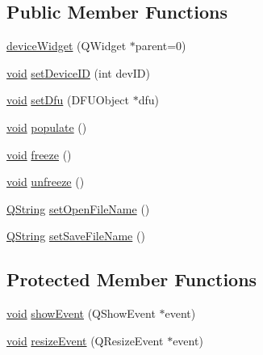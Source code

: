 \subsection*{\-Public \-Member \-Functions}
\begin{DoxyCompactItemize}
\item 
\hyperlink{group___y_modem_uploader_gafcee9273f2b8216d324c235d5e164899}{device\-Widget} (\-Q\-Widget $\ast$parent=0)
\item 
\hyperlink{group___u_a_v_objects_plugin_ga444cf2ff3f0ecbe028adce838d373f5c}{void} \hyperlink{group___y_modem_uploader_ga9b64e94e398f8362d8dcae0b9ec4275f}{set\-Device\-I\-D} (int dev\-I\-D)
\item 
\hyperlink{group___u_a_v_objects_plugin_ga444cf2ff3f0ecbe028adce838d373f5c}{void} \hyperlink{group___y_modem_uploader_gadc475267f79d2e50ec5eac4f043aa058}{set\-Dfu} (\-D\-F\-U\-Object $\ast$dfu)
\item 
\hyperlink{group___u_a_v_objects_plugin_ga444cf2ff3f0ecbe028adce838d373f5c}{void} \hyperlink{group___uploader_gaf56d7d5fb2715ab7213ea4193df3b373}{populate} ()
\item 
\hyperlink{group___u_a_v_objects_plugin_ga444cf2ff3f0ecbe028adce838d373f5c}{void} \hyperlink{group___uploader_gac5513bd475a701ede81cde9432e8ddf2}{freeze} ()
\item 
\hyperlink{group___u_a_v_objects_plugin_ga444cf2ff3f0ecbe028adce838d373f5c}{void} \hyperlink{group___uploader_ga6273e94cd08759c019fbb9a1063cbd26}{unfreeze} ()
\item 
\hyperlink{group___u_a_v_objects_plugin_gab9d252f49c333c94a72f97ce3105a32d}{\-Q\-String} \hyperlink{group___uploader_ga6ad26364234edf8c743b0b08885050b1}{set\-Open\-File\-Name} ()
\item 
\hyperlink{group___u_a_v_objects_plugin_gab9d252f49c333c94a72f97ce3105a32d}{\-Q\-String} \hyperlink{group___uploader_ga1c33b640cfaca086fcfd5574eecec8ef}{set\-Save\-File\-Name} ()
\end{DoxyCompactItemize}
\subsection*{\-Protected \-Member \-Functions}
\begin{DoxyCompactItemize}
\item 
\hyperlink{group___u_a_v_objects_plugin_ga444cf2ff3f0ecbe028adce838d373f5c}{void} \hyperlink{group___y_modem_uploader_gae8c02916851ec8e041d9e2fb1be90a91}{show\-Event} (\-Q\-Show\-Event $\ast$event)
\item 
\hyperlink{group___u_a_v_objects_plugin_ga444cf2ff3f0ecbe028adce838d373f5c}{void} \hyperlink{group___y_modem_uploader_ga732d883048a75c6bac92c02fe90f2184}{resize\-Event} (\-Q\-Resize\-Event $\ast$event)
\end{DoxyCompactItemize}


